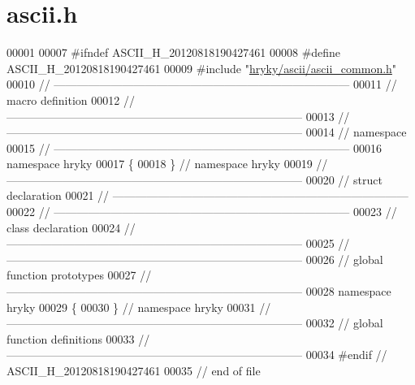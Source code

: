 \hypertarget{ascii_8h_source}{\section{ascii.\-h}
}

\begin{DoxyCode}
00001 
00007 \textcolor{preprocessor}{#ifndef ASCII\_H\_20120818190427461}
00008 \textcolor{preprocessor}{}\textcolor{preprocessor}{#define ASCII\_H\_20120818190427461}
00009 \textcolor{preprocessor}{}\textcolor{preprocessor}{#include "\hyperlink{ascii__common_8h}{hryky/ascii/ascii_common.h}"}
00010 \textcolor{comment}{//
      ------------------------------------------------------------------------------}
00011 \textcolor{comment}{// macro definition}
00012 \textcolor{comment}{//
      ------------------------------------------------------------------------------}
00013 \textcolor{comment}{//
      ------------------------------------------------------------------------------}
00014 \textcolor{comment}{// namespace}
00015 \textcolor{comment}{//
      ------------------------------------------------------------------------------}
00016 \textcolor{keyword}{namespace }hryky
00017 \{
00018 \} \textcolor{comment}{// namespace hryky}
00019 \textcolor{comment}{//
      ------------------------------------------------------------------------------}
00020 \textcolor{comment}{// struct declaration}
00021 \textcolor{comment}{//
      ------------------------------------------------------------------------------}
00022 \textcolor{comment}{//
      ------------------------------------------------------------------------------}
00023 \textcolor{comment}{// class declaration}
00024 \textcolor{comment}{//
      ------------------------------------------------------------------------------}
00025 \textcolor{comment}{//
      ------------------------------------------------------------------------------}
00026 \textcolor{comment}{// global function prototypes}
00027 \textcolor{comment}{//
      ------------------------------------------------------------------------------}
00028 \textcolor{keyword}{namespace }hryky
00029 \{
00030 \} \textcolor{comment}{// namespace hryky}
00031 \textcolor{comment}{//
      ------------------------------------------------------------------------------}
00032 \textcolor{comment}{// global function definitions}
00033 \textcolor{comment}{//
      ------------------------------------------------------------------------------}
00034 \textcolor{preprocessor}{#endif // ASCII\_H\_20120818190427461}
00035 \textcolor{preprocessor}{}\textcolor{comment}{// end of file}
\end{DoxyCode}
